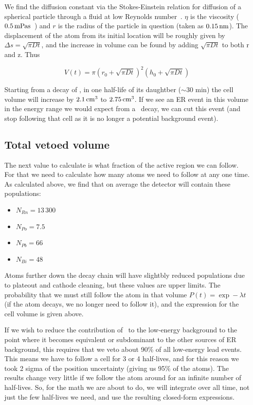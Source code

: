 We find the diffusion constant via the Stokes-Einstein relation for diffusion of a spherical particle through a fluid at low Reynolds number~\cite{Sutherland:1905,Einstein:1905,Smoluchowski:1906}. $\eta$ is the viscosity ($0.5\, \mathrm{mPa s}$~\cite{Legros:1965}) and $r$ is the radius of the particle in question (taken as $0.15\, \mathrm{nm}$). The displacement of the atom from its initial location will be roughly given by $\Delta s = \sqrt{\pi Dt}$, and the increase in volume can be found by adding $\sqrt{\pi Dt}$ to both r and z. Thus

\begin{equation}
V(t) = \pi(r_0 + \sqrt{\pi Dt})^2(h_0 + \sqrt{\pi Dt})
\end{equation}

Starting from a decay of \Po, in one half-life of its daughtber ($\sim$30 min) the cell volume will increase by $2.1\, \mathrm{cm^3}$ to $2.75\, \mathrm{cm^3}$. If we see an ER event in this volume in the energy range we would expect from a \Pb~decay, we can cut this event (and stop following that cell as it is no longer a potential background event).

\subsection{Total vetoed volume}

The next value to calculate is what fraction of the active region we can follow. For that we need to calculate how many atoms we need to follow at any one time. As calculated above, we find that on average the detector will contain these populations:
\begin{itemize}
    \item $N_{Rn} = 13\,300$
    \item $N_{Po} = 7.5$
    \item $N_{Pb} = 66$
    \item $N_{Bi} = 48$
\end{itemize}

Atoms further down the decay chain will have slightbly reduced populations due to plateout and cathode cleaning, but these values are upper limits. The probability that we must still follow the atom in that volume $P(t) = \exp -\lambda t$ (if the atom decays, we no longer need to follow it), and the expression for the cell volume is given above.

If we wish to reduce the contribution of \Pb~to the low-energy background to the point where it becomes equivalent or subdominant to the other sources of ER background, this requires that we veto about 90\% of all low-energy lead events. This means we have to follow a cell for 3 or 4 half-lives, and for this reason we took 2 sigma of the position uncertainty (giving us 95\% of the atoms). The results change very little if we follow the atom around for an infinite number of half-lives. So, for the math we are about to do, we will integrate over all time, not just the few half-lives we need, and use the resulting closed-form expressions.


